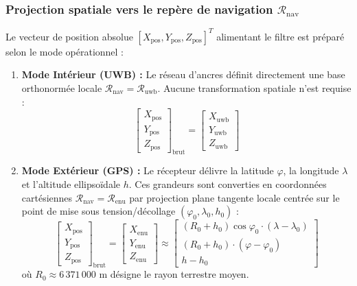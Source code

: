 \documentclass[../Formulations_Kalman.tex]{subfiles}
\begin{document}
\subsubsection{Projection spatiale vers le repère de navigation $\mathcal{R}_{\text{nav}}$}
Le vecteur de position absolue $[X_{\text{pos}}, Y_{\text{pos}}, Z_{\text{pos}}]^T$ alimentant le filtre est préparé selon le mode opérationnel :
\begin{enumerate}
    \item \textbf{Mode Intérieur (UWB) :} Le réseau d'ancres définit directement une base orthonormée locale $\mathcal{R}_{\text{nav}} = \mathcal{R}_{\text{uwb}}$. Aucune transformation spatiale n'est requise :
    \begin{equation}
    \begin{bmatrix} X_{\text{pos}} \\ Y_{\text{pos}} \\ Z_{\text{pos}} \end{bmatrix}_{\text{brut}} = \begin{bmatrix} X_{\text{uwb}} \\ Y_{\text{uwb}} \\ Z_{\text{uwb}} \end{bmatrix}
    \end{equation}
    \item \textbf{Mode Extérieur (GPS) :} Le récepteur délivre la latitude $\varphi$, la longitude $\lambda$ et l'altitude ellipsoïdale $h$. Ces grandeurs sont converties en coordonnées cartésiennes $\mathcal{R}_{\text{nav}} = \mathcal{R}_{\text{enu}}$ par projection plane tangente locale centrée sur le point de mise sous tension/décollage $(\varphi_0, \lambda_0, h_0)$ :
    \begin{equation}
    \begin{bmatrix} X_{\text{pos}} \\ Y_{\text{pos}} \\ Z_{\text{pos}} \end{bmatrix}_{\text{brut}} = \begin{bmatrix} X_{\text{enu}} \\ Y_{\text{enu}} \\ Z_{\text{enu}} \end{bmatrix} \approx \begin{bmatrix} (R_0 + h_0) \cos\varphi_0 \cdot (\lambda - \lambda_0) \\ (R_0 + h_0) \cdot (\varphi - \varphi_0) \\ h - h_0 \end{bmatrix}
    \end{equation}
    où $R_0 \approx 6\,371\,000\text{ m}$ désigne le rayon terrestre moyen.
\end{enumerate}
\end{document}
